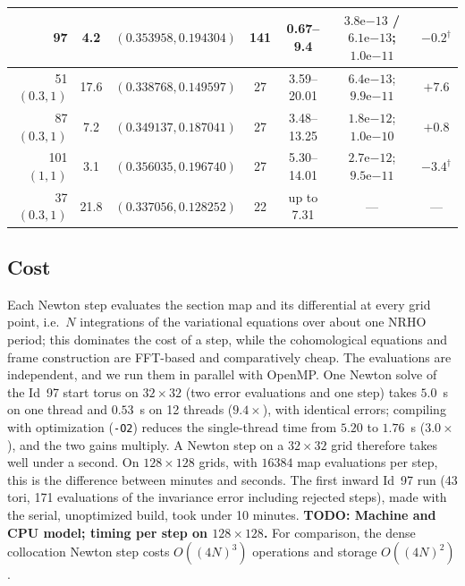 \documentclass[11pt]{article}
\newcommand{\todo}[1]{\textbf{TODO: #1}}
\begin{document}
\begin{table}[t]
\begin{tabular}{rcccccc}
97 &  4.2 & $(0.353958, 0.194304)$ & 141 & 0.67--9.4 & $3.8\mathrm{e}{-13}$ / $6.1\mathrm{e}{-13}$; $1.0\mathrm{e}{-11}$ & $-0.2^{\dagger}$ \\
\midrule
51 $(0.3,1)$ & 17.6 & $(0.338768, 0.149597)$ & 27 & 3.59--20.01 & $6.4\mathrm{e}{-13}$; $9.9\mathrm{e}{-11}$ & $+7.6$ \\
87 $(0.3,1)$ &  7.2 & $(0.349137, 0.187041)$ & 27 & 3.48--13.25 & $1.8\mathrm{e}{-12}$; $1.0\mathrm{e}{-10}$ & $+0.8$ \\
101 $(1,1)$  &  3.1 & $(0.356035, 0.196740)$ & 27 & 5.30--14.01 & $2.7\mathrm{e}{-12}$; $9.5\mathrm{e}{-11}$ & $-3.4^{\dagger}$ \\
37 $(0.3,1)$ & 21.8 & $(0.337056, 0.128252)$ & 22 & up to 7.31 & --- & --- \\
\bottomrule
\end{tabular}
\end{table}

\subsection{Cost}
Each Newton step evaluates the section map and its differential at every grid point, i.e.\ $N$
integrations of the variational equations over about one NRHO period; this dominates the cost of
a step, while the cohomological equations and frame construction are FFT-based and comparatively
cheap. The evaluations are independent, and we run them in parallel with OpenMP. One Newton solve
of the Id~97 start torus on $32\times32$ (two error evaluations and one step) takes $5.0$~s on one
thread and $0.53$~s on 12 threads ($9.4\times$), with identical errors; compiling with
optimization (\texttt{-O2}) reduces the single-thread time from $5.20$ to $1.76$~s ($3.0\times$),
and the two gains multiply. A Newton step on a $32\times32$ grid therefore takes well under a
second. On $128\times128$ grids, with $16384$ map evaluations per step, this is the difference
between minutes and seconds. The first inward Id~97 run (43 tori, 171 evaluations of the
invariance error including rejected steps), made with the serial, unoptimized build, took under 10
minutes. \todo{Machine and CPU model; timing per step on $128\times128$.}
For comparison, the dense collocation Newton step costs $O((4N)^3)$ operations and storage
$O((4N)^2)$.


\end{document}
